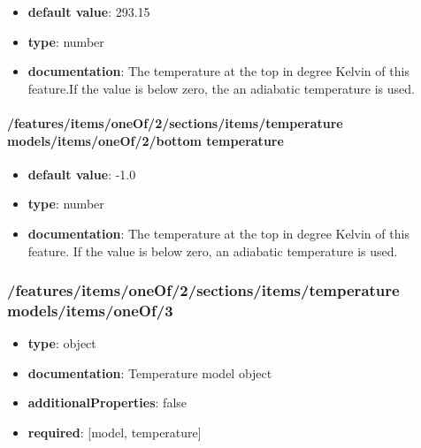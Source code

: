 \begin{itemize}\item {\bf default value}: 293.15
\item {\bf type}: number
\item {\bf documentation}: The temperature at the top in degree Kelvin of this feature.If the value is below zero, the an adiabatic temperature is used.
\end{itemize}\paragraph{/features/items/oneOf/2/sections/items/temperature models/items/oneOf/2/bottom temperature}
\begin{itemize}\item {\bf default value}: -1.0
\item {\bf type}: number
\item {\bf documentation}: The temperature at the top in degree Kelvin of this feature. If the value is below zero, an adiabatic temperature is used.
\end{itemize}\subsubsection{/features/items/oneOf/2/sections/items/temperature models/items/oneOf/3}
\begin{itemize}\item {\bf type}: object
\item {\bf documentation}: Temperature model object
\item {\bf additionalProperties}: false
\item {\bf required}: [model, temperature]\end{itemize}
